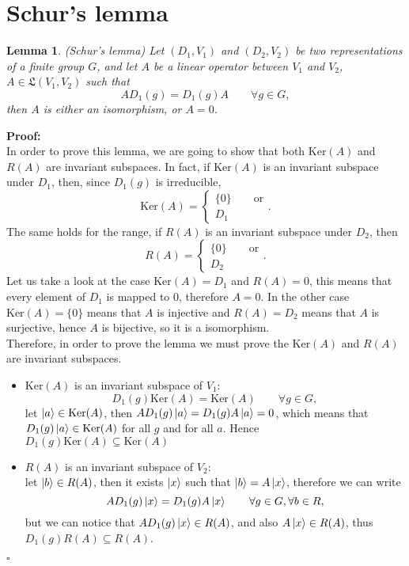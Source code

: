 \documentclass[12pt]{book}
\theoremstyle{plain}
\newtheorem{lem}[thm]{Lemma}
\theoremstyle{definition}
\theoremstyle{remark}
\begin{document}
\section{Schur's lemma}
\begin{lem}(Schur's lemma)
Let $(D_1,V_1)$ and $(D_2,V_2)$ be two representations of a finite group $G$, and let  $A$ be a linear operator between $V_1$ and $V_2$, $A\in \mathfrak{L}(V_1,V_2)$ such that
\[AD_1(g) = D_1(g) A \qquad \forall g \in G,\]
then $A$ is either an isomorphism, or $A=0$.
\end{lem}
\hspace{-1.4em}\textbf{Proof:}\\
In order to prove this lemma, we are going to show that both $\text{Ker}(A)$ and $R(A)$ are invariant subspaces. In fact, if $\text{Ker}(A)$ is an invariant subspace under $D_1$, then, since $D_1(g)$ is irreducible,
\[\text{Ker}(A) = \begin{cases} \{0\} \qquad \text{or}\\
D_1\end{cases}. \]
The same holds for the range, if $R(A)$ is an invariant subspace under $D_2$, then 
\[R(A) = \begin{cases} \{0\} \qquad \text{or}\\
D_2\end{cases}. \]
Let us take a look at the case $\text{Ker}(A) = D_1$ and $R(A) = 0$, this means that every element of $D_1$ is mapped to 0, therefore $A=0$. In the other case $\text{Ker}(A) = \{0\}$ means that $A$ is injective and $R(A) = D_2$ means that $A$ is surjective, hence $A$ is bijective, so it is a isomorphism.\\
Therefore, in order to prove the lemma we must prove the $\text{Ker}(A)$ and $R(A)$ are invariant subspaces.
\begin{itemize}
	\item $\text{Ker}(A)$ is an invariant subspace of $V_1$:
	\[D_1(g)\text{Ker}(A) = \text{Ker}(A) \qquad \forall g\in G,\]
	let $\ket{a}\in \text{Ker}(A)$, then $AD_1(g) \ket{a} = D_1(g)A\ket{a} = 0$, which means that $D_1(g) \ket{a}\in\text{Ker}(A)$ for all $g$ and for all $a$. Hence $D_1(g)\text{Ker}(A) \subseteq \text{Ker}(A)$ 
	\item $R(A)$ is an invariant subspace of $V_2$:\\
	let $\ket{b}\in R(A)$, then it exists $\ket{x}$ such that $\ket{b} = A\ket{x}$, therefore we can write
	\[AD_1(g) \ket{x} = D_1(g)A\ket{x} \qquad \forall g\in G,\forall b\in R,\]
	but we can notice that $AD_1(g) \ket{x}\in R(A)$, and also $A\ket{x}\in R(A)$, thus $D_1(g)R(A) \subseteq R(A)$.
\end{itemize}\hfill\ensuremath{\square}\\
\end{document}
